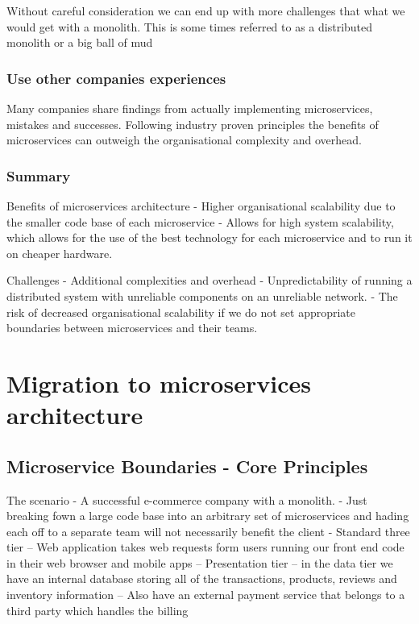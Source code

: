 \documentclass[a4paper, 11pt]{book}
\begin{document}
    Without careful consideration we can end up with more challenges that what we would get with a monolith.
    This is some times referred to as a distributed monolith or a big ball of mud

    \subsubsection{Use other companies experiences}
    Many companies share findings from actually implementing microservices, mistakes and successes.
    Following industry proven principles the benefits of microservices can outweigh the organisational complexity and overhead.

    \subsubsection{Summary}
    Benefits of microservices architecture
    - Higher organisational scalability due to the smaller code base of each microservice
    - Allows for high system scalability, which allows for the use of the best technology for each microservice and to run it on cheaper hardware.

    Challenges
    - Additional complexities and overhead
    - Unpredictability of running a distributed system with unreliable components on an unreliable network.
    - The risk of decreased organisational scalability if we do not set appropriate boundaries between microservices and their teams.

    \section{Migration to microservices architecture}

    \subsection{Microservice Boundaries - Core Principles}
    The scenario - A successful e-commerce company with a monolith.
    - Just breaking fown a large code base into an arbitrary set of microservices and hading each off to a separate team will not necessarily benefit the client
    - Standard three tier
    -- Web application takes web requests form users running our front end code in their web browser and mobile apps -- Presentation tier
    -- in the data tier we have an internal database storing all of the transactions, products, reviews and inventory information
    -- Also have an external payment service that belongs to a third party which handles the billing
\end{document}
